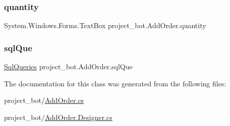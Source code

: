 \subsubsection{\texorpdfstring{quantity}{quantity}}
{\footnotesize\ttfamily System.\+Windows.\+Forms.\+Text\+Box project\+\_\+bot.\+Add\+Order.\+quantity\hspace{0.3cm}{\ttfamily [private]}}

\mbox{\label{classproject__bot_1_1_add_order_ac3cae6d6f1afb0e7f3d77d660096c332}} 
\subsubsection{\texorpdfstring{sql\+Que}{sqlQue}}
{\footnotesize\ttfamily \hyperlink{classproject__bot_1_1_sql_queries}{Sql\+Queries} project\+\_\+bot.\+Add\+Order.\+sql\+Que\hspace{0.3cm}{\ttfamily [private]}}



The documentation for this class was generated from the following files\+:\begin{DoxyCompactItemize}
\item 
project\+\_\+bot/\hyperlink{_add_order_8cs}{Add\+Order.\+cs}\item 
project\+\_\+bot/\hyperlink{_add_order_8_designer_8cs}{Add\+Order.\+Designer.\+cs}\end{DoxyCompactItemize}
